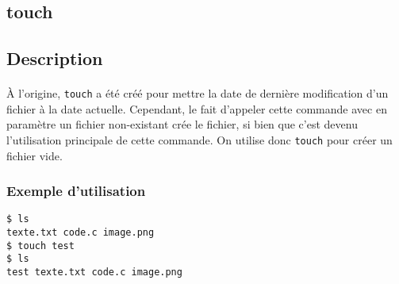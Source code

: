\subsection{touch}
\subsection*{Description}

\paragraph{} À l'origine, \texttt{touch} a été créé pour mettre la date de
dernière modification d'un fichier à la date actuelle. Cependant, le fait
d'appeler cette commande avec en paramètre un fichier non-existant crée le
fichier, si bien que c'est devenu l'utilisation principale de cette commande.
On utilise donc \texttt{touch} pour créer un fichier vide.

\subsubsection*{Exemple d'utilisation}

\begin{lstlisting}
$ ls
texte.txt code.c image.png
$ touch test
$ ls
test texte.txt code.c image.png
\end{lstlisting}
